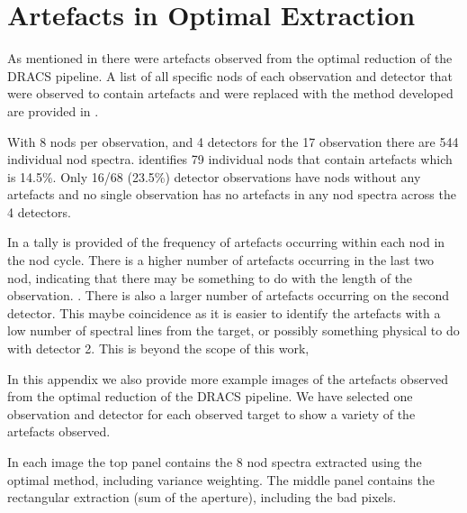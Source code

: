 
\chapter{Artefacts in Optimal Extraction}
\label{appendix:artefacts}





As mentioned in  there were artefacts observed from the optimal reduction of the {DRACS} pipeline. A list of all specific nods of each observation and detector that were observed to contain artefacts and were replaced with the method developed are provided in .

With 8 nods per observation, and 4 detectors for the 17 observation there are 544 individual nod spectra.  identifies 79 individual nods that contain artefacts which is 14.5\%. Only 16/68 (23.5\%) detector observations have nods without any artefacts and no single observation has no artefacts in any nod spectra across the 4 detectors.

In  a tally is provided of the frequency of artefacts occurring within each nod in the nod cycle. There is a higher number of artefacts occurring in the last two nod, indicating that there may be something to do with the length of the observation. .
There is also a larger number of artefacts occurring on the second detector. This maybe coincidence as it is easier to identify the artefacts with a low number of spectral lines from the target, or possibly something physical to do with detector 2. This is beyond the scope of this work, 

In this appendix we also provide more example images of the artefacts observed from the optimal reduction of the {DRACS} pipeline. We have selected one observation and detector for each observed target to show a variety of the artefacts observed.

In each image the top panel contains the 8 nod spectra extracted using the optimal method, including variance weighting. The middle panel contains the rectangular extraction (sum of the aperture), including the bad pixels.

